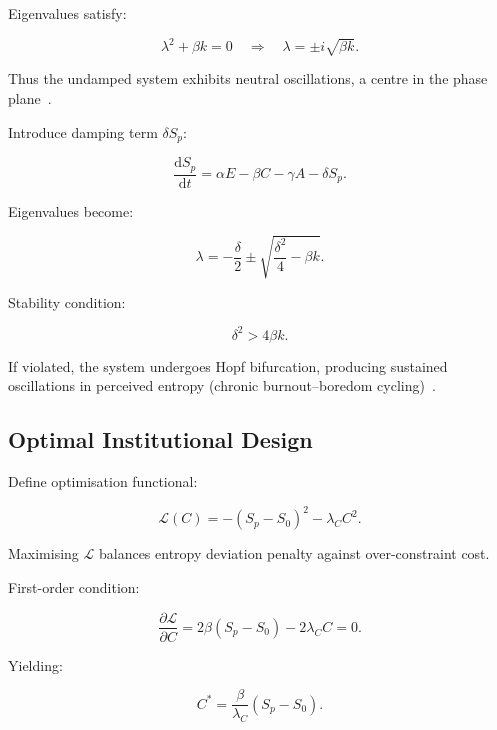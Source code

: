 \documentclass[12pt,a4paper]{article}
\theoremstyle{definition}
\newcommand{\ddt}[1]{\frac{\mathrm{d}#1}{\mathrm{d}t}}
\begin{document}
Eigenvalues satisfy:

\begin{equation}
  \lambda^2 + \beta k = 0
  \quad \Rightarrow \quad
  \lambda = \pm i\sqrt{\beta k}.
\end{equation}

Thus the undamped system exhibits neutral oscillations,
a centre in the phase plane~\citep{strogatz2018}.

Introduce damping term $\delta S_p$:

\begin{equation}
  \ddt{S_p} =
  \alpha E - \beta C - \gamma A - \delta S_p.
\end{equation}

Eigenvalues become:

\begin{equation}
  \lambda =
  -\frac{\delta}{2}
  \pm
  \sqrt{
    \frac{\delta^2}{4}
    - \beta k
  }.
\end{equation}

Stability condition:

\begin{equation}
  \delta^2 > 4\beta k.
\end{equation}

If violated, the system undergoes Hopf bifurcation,
producing sustained oscillations in perceived entropy
(chronic burnout–boredom cycling)~\citep{strogatz2018}.

\subsection{Optimal Institutional Design}

Define optimisation functional:

\begin{equation}
  \mathcal{L}(C) =
  - (S_p - S_0)^2
  - \lambda_C C^2.
\end{equation}

Maximising $\mathcal{L}$ balances
entropy deviation penalty against over-constraint cost.

First-order condition:

\begin{equation}
  \frac{\partial \mathcal{L}}{\partial C}
  =
  2\beta (S_p - S_0)
  - 2\lambda_C C
  = 0.
\end{equation}

Yielding:

\begin{equation}
  C^* =
  \frac{\beta}{\lambda_C}(S_p - S_0).
\end{equation}
\end{document}
